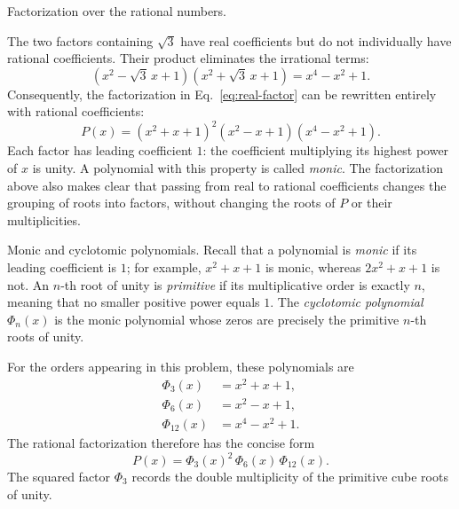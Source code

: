 \documentclass[11pt,aspectratio=169]{beamer}
\newcommand{\slidebody}{%
  \fontsize{10.6}{12.8}\selectfont\justifying%
  \setlength{\parskip}{4.2pt}%
  \setlength{\abovedisplayskip}{4pt}%
  \setlength{\belowdisplayskip}{4pt}%
  \setlength{\abovedisplayshortskip}{2pt}%
  \setlength{\belowdisplayshortskip}{2.5pt}%
}
\newcommand{\tightbody}{\slidebody\fontsize{10.2}{12.3}\selectfont\setlength{\parskip}{3pt}}
\begin{document}
\begin{frame}[t]{Factorization over the rational numbers.}
\slidebody
The two factors containing $\sqrt{3}$ have real coefficients but do not individually have rational coefficients. Their product eliminates the irrational terms:
\begin{equation}\label{eq:rational-merge}
 (x^2-\sqrt{3}\,x+1)(x^2+\sqrt{3}\,x+1)=x^4-x^2+1.
\end{equation}
Consequently, the factorization in Eq.~\eqref{eq:real-factor} can be rewritten entirely with rational coefficients:
\begin{equation}\label{eq:rational-factor}
 P(x)=(x^2+x+1)^2(x^2-x+1)(x^4-x^2+1).
\end{equation}
Each factor has leading coefficient $1$: the coefficient multiplying its highest power of $x$ is unity. A polynomial with this property is called \emph{monic}. The factorization above also makes clear that passing from real to rational coefficients changes the grouping of roots into factors, without changing the roots of $P$ or their multiplicities.
\end{frame}

\begin{frame}[t]{Monic and cyclotomic polynomials.}
\tightbody
\fontsize{10.0}{11.8}\selectfont\setlength{\parskip}{2pt}
Recall that a polynomial is \emph{monic} if its leading coefficient is $1$; for example, $x^2+x+1$ is monic, whereas $2x^2+x+1$ is not. An $n$-th root of unity is \emph{primitive} if its multiplicative order is exactly $n$, meaning that no smaller positive power equals $1$. The \emph{cyclotomic polynomial} $\Phi_n(x)$ is the monic polynomial whose zeros are precisely the primitive $n$-th roots of unity.

For the orders appearing in this problem, these polynomials are
\begin{equation}\label{eq:phi-explicit}
\begin{aligned}
 \Phi_3(x)&=x^2+x+1,\\
 \Phi_6(x)&=x^2-x+1,\\
 \Phi_{12}(x)&=x^4-x^2+1.
\end{aligned}
\end{equation}
The rational factorization therefore has the concise form
\begin{equation}\label{eq:cyclotomic}
 P(x)=\Phi_3(x)^2\,\Phi_6(x)\,\Phi_{12}(x).
\end{equation}
The squared factor $\Phi_3$ records the double multiplicity of the primitive cube roots of unity.
\end{frame}
\end{document}
